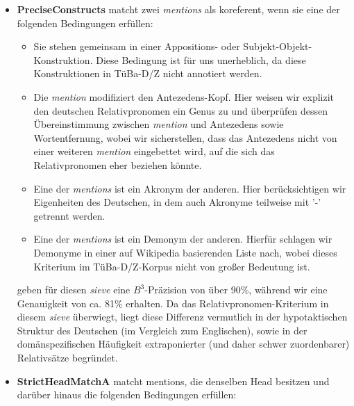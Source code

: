 \documentclass{scrartcl}
\begin{document}
\begin{itemize}
\item \textbf{PreciseConstructs} matcht zwei \textit{mentions} als koreferent, wenn sie eine der folgenden Bedingungen erfüllen: 
\begin{itemize}
	\item Sie stehen gemeinsam in einer Appositions- oder Subjekt-Objekt-Konstruktion. Diese Bedingung ist für uns unerheblich, da diese Konstruktionen in TüBa-D/Z nicht annotiert werden.
	\item Die \textit{mention} modifiziert den Antezedens-Kopf. Hier weisen wir explizit den deutschen Relativpronomen ein Genus zu und überprüfen dessen Übereinstimmung zwischen \textit{mention} und Antezedens sowie Wortentfernung, wobei wir sicherstellen, dass das Antezedens nicht von einer weiteren \textit{mention} eingebettet wird, auf die sich das Relativpronomen eher beziehen könnte.
	\item Eine der \textit{mentions} ist ein Akronym der anderen. Hier berücksichtigen wir Eigenheiten des Deutschen, in dem auch Akronyme teilweise mit '-' getrennt werden.
	\item Eine der \textit{mentions} ist ein Demonym der anderen. Hierfür schlagen wir Demonyme in einer auf Wikipedia basierenden Liste nach, wobei dieses Kriterium im TüBa-D/Z-Korpus nicht von großer Bedeutung ist.
\end{itemize}
 geben für diesen \textit{sieve} eine $B^3$-Präzision von über 90\%, während wir eine Genauigkeit von ca. 81\% erhalten. Da das Relativpronomen-Kriterium in diesem \textit{sieve} überwiegt, liegt diese Differenz vermutlich in der hypotaktischen Struktur des Deutschen (im Vergleich zum Englischen), sowie in der domänspezifischen Häufigkeit extraponierter (und daher schwer zuordenbarer) Relativsätze begründet.

\item \textbf{StrictHeadMatchA} matcht mentions, die denselben Head besitzen und darüber hinaus die folgenden Bedingungen erfüllen:



\end{itemize}
\end{document}

